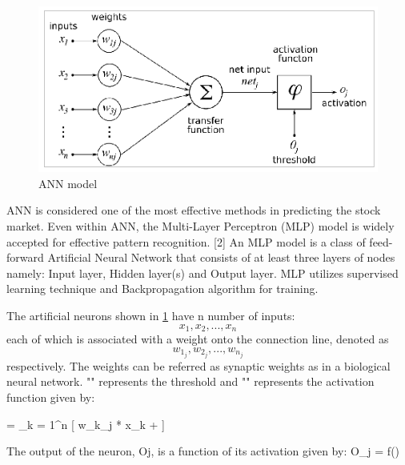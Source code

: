 \begin{figure}[h!]\centering
	\includegraphics[width=5in]{fig/NN}
  
	\caption{ANN model }\label{fig:NN}

 \end{figure}

ANN is considered one of the most effective methods in predicting the stock market. Even within ANN, the Multi-Layer Perceptron (MLP) model is widely accepted for effective pattern recognition. [2] An MLP model is a class of feed-forward Artificial Neural Network that consists of at least three layers of nodes namely: Input layer, Hidden layer(s) and Output layer. MLP utilizes supervised learning technique and Backpropagation algorithm for training.

The artificial neurons shown in \ref{fig:NN} have n number of inputs: \[x_1, x_2,...,x_n\] each of which is associated with a weight onto the connection line, denoted as \[w_1_j, w_2_j,...,w_n_j\] respectively. The weights can be referred as synaptic weights as in a biological neural network. "\theta  \]"  represents the threshold and "\alpha  \]" represents the activation function given by:

\alpha = \sum_{k = 1}^{n} [ w_k_j * x_k + \theta]

The output of the neuron, Oj, is a function of its activation given by:
O_j = f(\alpha)

